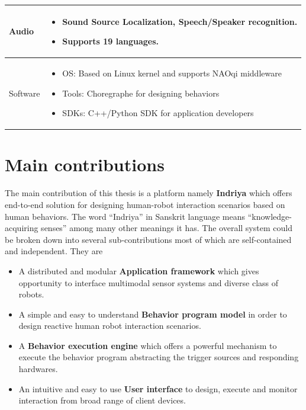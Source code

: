 \begin{table}[H]
\begin{tabular}{ | l | p{12cm} |}
  Audio & \begin{itemize}[leftmargin=*,topsep={0pt},itemsep={0pt},partopsep={0pt},parsep={0pt}] \item Sound Source Localization, Speech/Speaker recognition. \item Supports 19 languages.\end{itemize} \\
                                          \hline
  Software & \begin{itemize}[leftmargin=*,topsep={0pt},itemsep={0pt},partopsep={0pt},parsep={0pt}] \item OS: Based on Linux kernel and supports NAOqi middleware
  							\item Tools: Choregraphe \cite{Choregraphe} for designing behaviors
  							\item SDKs: C++/Python SDK for application developers \end{itemize} \\
                                          \hline
    \end{tabular}
\end{table}
\section{Main contributions}
\label{sec:contributions}
The main contribution of this thesis is a platform namely \textbf{Indriya} which offers end-to-end solution for designing human-robot interaction scenarios based on human behaviors. The word ``Indriya'' in Sanskrit language means ``knowledge-acquiring senses'' among many other meanings it has. The overall system could be broken down into several sub-contributions most of which are self-contained and independent. They are
\begin{itemize}
\item A distributed and modular \textbf{Application framework} which gives opportunity to interface multimodal sensor systems and diverse class of robots.
\item A simple and easy to understand \textbf{Behavior program model} in order to design reactive human robot interaction scenarios.
\item A \textbf{Behavior execution engine} which offers a powerful mechanism to execute the behavior program abstracting the trigger sources and responding hardwares.
\item An intuitive and easy to use \textbf{User interface} to design, execute and monitor interaction from broad range of client devices.
\end{itemize}

